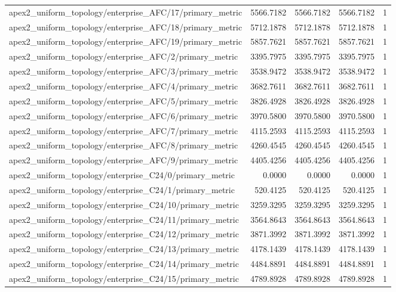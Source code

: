 \begin{table}[h]
\begin{tabular}{lrrrr}
apex2_uniform_topology/enterprise_AFC/17/primary_metric & 5566.7182 & 5566.7182 & 5566.7182 & 1 \\
apex2_uniform_topology/enterprise_AFC/18/primary_metric & 5712.1878 & 5712.1878 & 5712.1878 & 1 \\
apex2_uniform_topology/enterprise_AFC/19/primary_metric & 5857.7621 & 5857.7621 & 5857.7621 & 1 \\
apex2_uniform_topology/enterprise_AFC/2/primary_metric & 3395.7975 & 3395.7975 & 3395.7975 & 1 \\
apex2_uniform_topology/enterprise_AFC/3/primary_metric & 3538.9472 & 3538.9472 & 3538.9472 & 1 \\
apex2_uniform_topology/enterprise_AFC/4/primary_metric & 3682.7611 & 3682.7611 & 3682.7611 & 1 \\
apex2_uniform_topology/enterprise_AFC/5/primary_metric & 3826.4928 & 3826.4928 & 3826.4928 & 1 \\
apex2_uniform_topology/enterprise_AFC/6/primary_metric & 3970.5800 & 3970.5800 & 3970.5800 & 1 \\
apex2_uniform_topology/enterprise_AFC/7/primary_metric & 4115.2593 & 4115.2593 & 4115.2593 & 1 \\
apex2_uniform_topology/enterprise_AFC/8/primary_metric & 4260.4545 & 4260.4545 & 4260.4545 & 1 \\
apex2_uniform_topology/enterprise_AFC/9/primary_metric & 4405.4256 & 4405.4256 & 4405.4256 & 1 \\
apex2_uniform_topology/enterprise_C24/0/primary_metric & 0.0000 & 0.0000 & 0.0000 & 1 \\
apex2_uniform_topology/enterprise_C24/1/primary_metric & 520.4125 & 520.4125 & 520.4125 & 1 \\
apex2_uniform_topology/enterprise_C24/10/primary_metric & 3259.3295 & 3259.3295 & 3259.3295 & 1 \\
apex2_uniform_topology/enterprise_C24/11/primary_metric & 3564.8643 & 3564.8643 & 3564.8643 & 1 \\
apex2_uniform_topology/enterprise_C24/12/primary_metric & 3871.3992 & 3871.3992 & 3871.3992 & 1 \\
apex2_uniform_topology/enterprise_C24/13/primary_metric & 4178.1439 & 4178.1439 & 4178.1439 & 1 \\
apex2_uniform_topology/enterprise_C24/14/primary_metric & 4484.8891 & 4484.8891 & 4484.8891 & 1 \\
apex2_uniform_topology/enterprise_C24/15/primary_metric & 4789.8928 & 4789.8928 & 4789.8928 & 1 \\

\end{tabular}
\end{table}
